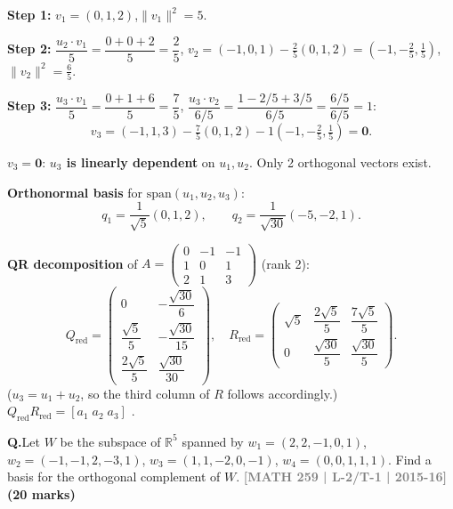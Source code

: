 \documentclass[12pt,a3paper]{article}
\newcommand{\yr}[1]{\hfill\textcolor{gray}{\small\textbf{[#1]}}}
\newcommand{\mk}[1]{\textcolor{orange!70!black}{\small\textbf{(#1 marks)}}}
\newcounter{qnum}
\newcommand{\Q}[1]{%
  \needspace{4\baselineskip}
  \refstepcounter{qnum}
  \vspace{6pt}
  \noindent\textbf{Q\theqnum.}\enspace #1\par
}
\begin{document}
\begin{tcolorbox}[enhanced,breakable,
  colback=cD!4,colframe=cD,boxrule=0.8pt,arc=5pt,
  title={\textbf{Answer --- Gram-Schmidt $u_1=(0,1,2)$, $u_2=(-1,0,1)$, $u_3=(-1,1,3)$; QR}},
  fonttitle=\bfseries\color{white},colbacktitle=cD]

\textbf{Step 1:} $v_1=(0,1,2)$,\quad $\|v_1\|^2=5$.

\textbf{Step 2:} $\dfrac{u_2\cdot v_1}{5}=\dfrac{0+0+2}{5}=\dfrac{2}{5}$,\quad
$v_2=(-1,0,1)-\tfrac{2}{5}(0,1,2)=\left(-1,-\tfrac{2}{5},\tfrac{1}{5}\right)$,\quad $\|v_2\|^2=\tfrac{6}{5}$.

\textbf{Step 3:} $\dfrac{u_3\cdot v_1}{5}=\dfrac{0+1+6}{5}=\dfrac{7}{5}$,\;
$\dfrac{u_3\cdot v_2}{6/5}=\dfrac{1-2/5+3/5}{6/5}=\dfrac{6/5}{6/5}=1$:
\[
v_3=(-1,1,3)-\tfrac{7}{5}(0,1,2)-1\!\left(-1,-\tfrac{2}{5},\tfrac{1}{5}\right)
=\mathbf{0}.
\]

$v_3=\mathbf{0}$: \textbf{$u_3$ is linearly dependent} on $u_1,u_2$. Only 2 orthogonal vectors exist.

\textbf{Orthonormal basis} for $\mathrm{span}(u_1,u_2,u_3)$:
\[
q_1=\frac{1}{\sqrt{5}}(0,1,2),\qquad
q_2=\frac{1}{\sqrt{30}}(-5,-2,1).
\]

\textbf{QR decomposition} of $A=\begin{pmatrix}0&-1&-1\\1&0&1\\2&1&3\end{pmatrix}$ (rank 2):
\[
Q_{\mathrm{red}}=\begin{pmatrix}
0&-\dfrac{\sqrt{30}}{6}\\[6pt]
\dfrac{\sqrt{5}}{5}&-\dfrac{\sqrt{30}}{15}\\[6pt]
\dfrac{2\sqrt{5}}{5}&\dfrac{\sqrt{30}}{30}
\end{pmatrix},\quad
R_{\mathrm{red}}=\begin{pmatrix}\sqrt{5}&\dfrac{2\sqrt{5}}{5}&\dfrac{7\sqrt{5}}{5}\\[6pt]0&\dfrac{\sqrt{30}}{5}&\dfrac{\sqrt{30}}{5}\end{pmatrix}.
\]
($u_3=u_1+u_2$, so the third column of $R$ follows accordingly.)
$Q_{\mathrm{red}}R_{\mathrm{red}}=[a_1\;a_2\;a_3]$ . \checkmark

\end{tcolorbox}

\Q{Let $W$ be the subspace of $\mathbb{R}^5$ spanned by $w_1 = (2,2,-1,0,1)$, $w_2 = (-1,-1,2,-3,1)$, $w_3 = (1,1,-2,0,-1)$, $w_4 = (0,0,1,1,1)$. Find a basis for the orthogonal complement of $W$.
\yr{MATH 259 | L-2/T-1 | 2015-16} \mk{20}}
\end{document}
